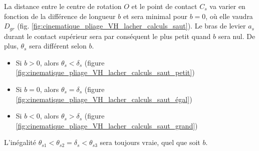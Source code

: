La distance entre le centre de rotation $O$ et le point de contact $C_s$ va varier en fonction de la différence de longueur $b$ et sera minimal pour $b=0$, où elle vaudra $D_{gr}$ (fig. \ref{fig:cinematique_pliage_VH_lacher_calculs_saut}). Le bras de levier $a_s$ durant le contact supérieur sera par conséquent le plus petit quand $b$ sera nul. De plus, $\theta_s$ sera différent selon $b$.
\begin{itemize}[label=$\circ$]
   \item Si $b>0$, alors $\theta_{s} < \delta_s $ (figure \ref{fig:cinematique_pliage_VH_lacher_calculs_saut_petit})
   \item Si $b=0$, alors $\theta_{s} = \delta_s $ (figure \ref{fig:cinematique_pliage_VH_lacher_calculs_saut_égal}) 
   \item Si $b<0$, alors $\theta_{s} > \delta_s $ (figure \ref{fig:cinematique_pliage_VH_lacher_calculs_saut_grand}) 
\end{itemize} 
L'inégalité $\theta_{s1} < \theta_{s2} = \delta_s < \theta_{s3}$ sera toujours vraie, quel que soit $b$.

